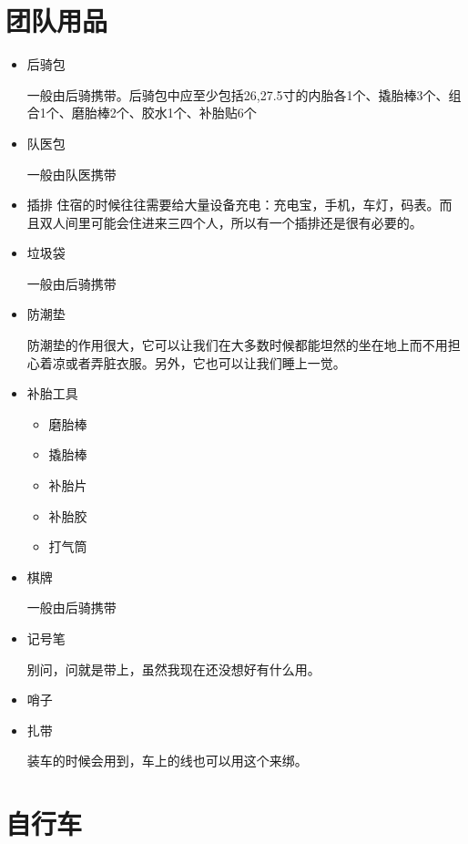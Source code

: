 \documentclass{ctexbook}
\begin{document}
    \section{团队用品} 
    \begin{itemize}
        \item 后骑包
    
        一般由后骑携带。后骑包中应至少包括26,27.5寸的内胎各1个、撬胎棒3个、组合1个、磨胎棒2个、胶水1个、补胎贴6个

        \item 队医包    
    
        一般由队医携带

        \item 插排
        住宿的时候往往需要给大量设备充电：充电宝，手机，车灯，码表。而且双人间里可能会住进来三四个人，所以有一个插排还是很有必要的。

        \item 垃圾袋   
    
        一般由后骑携带

        \item 防潮垫 
    
        防潮垫的作用很大，它可以让我们在大多数时候都能坦然的坐在地上而不用担心着凉或者弄脏衣服。另外，它也可以让我们睡上一觉。

        \item 补胎工具
        \begin{itemize}
            \item 磨胎棒
            \item 撬胎棒
            \item 补胎片
            \item 补胎胶
            \item 打气筒
        \end{itemize}
        \item 棋牌    
    
        一般由后骑携带
        \item 记号笔
        
        别问，问就是带上，虽然我现在还没想好有什么用。
        \item 哨子
        \item 扎带

        装车的时候会用到，车上的线也可以用这个来绑。
    \end{itemize}

    \section{自行车 } 
    
\end{document}
